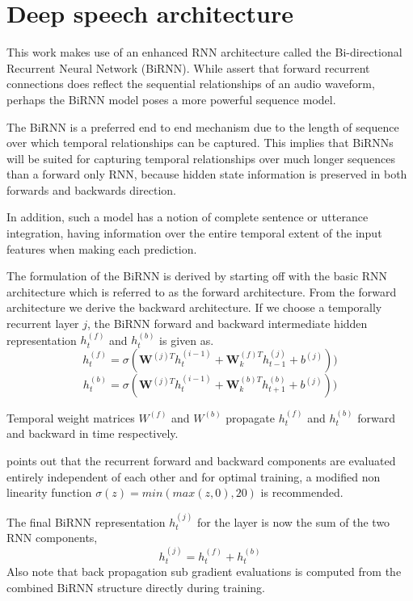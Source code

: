\section{Deep speech architecture}\label{deepspeech}

This work makes use of an enhanced RNN architecture called the Bi-directional Recurrent Neural Network (BiRNN). While \cite{hannun2014first} assert that forward recurrent connections does reflect the sequential relationships of an audio waveform, perhaps the BiRNN model poses a more powerful sequence model.

The BiRNN is a preferred end to end mechanism due to the length of sequence over which temporal relationships can be captured.  This implies that BiRNNs will be suited for capturing temporal relationships over much longer sequences than a forward only RNN, because hidden state information is preserved in both forwards and backwards direction. 

In addition, such a model has a notion of complete sentence or utterance  integration, having information over the entire temporal extent of the input features when making each prediction. 

The formulation of the BiRNN is derived by starting off with the basic RNN architecture which is referred to as the forward architecture.  From the forward architecture we derive the backward architecture. If we choose a temporally recurrent layer $j$, the BiRNN forward and backward intermediate hidden representation $h^{(f)}_t$ and $h^{(b)}_t$ is given as. 
\begin{equation}h_t^{(f)}=\sigma(\mathbf{W}^{(j)T}h_t^{(i-1)}+\mathbf{W}^{(f)T}_kh_{t-1}^{(j)}+b^{(j)}))
\label{eqn_c3_ds01}\end{equation}
\begin{equation}h_t^{(b)}=\sigma(\mathbf{W}^{(j)T}h_t^{(i-1)}+\mathbf{W}^{(b)T}_kh_{t+1}^{(b)}+b^{(j)}))
\label{eqn_c3_ds02}\end{equation}

Temporal weight matrices $W^{(f)}$ and $W^{(b)}$ propagate $h^{(f)}_t$  and $h^{(b)}_t$ forward and backward in time respectively. 

\cite{hannun2014first} points out that the recurrent forward and backward components are evaluated entirely independent of each other and for optimal training, a modified non linearity function $\sigma(z) = min(max(z, 0), 20)$ is recommended. 

The final BiRNN representation $h^{(j)}_t$ for the layer is now the sum of the two RNN components,
 \begin{equation}h_t^{(j)}=h_t^{(f)}+h_t^{(b)}
\label{eqn_c3_ds03}\end{equation}
Also note that back propagation sub gradient evaluations is computed from the combined BiRNN structure directly during training.

